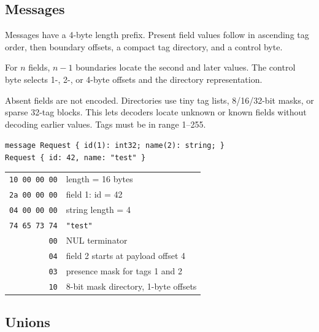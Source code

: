\documentclass[10pt,onecolumn]{article}
\begin{document}
\subsection{Messages}

\begin{minipage}{\textwidth}
\begin{minipage}[t]{0.41\textwidth}
Messages have a 4-byte length prefix. Present field values follow in ascending tag order, then boundary offsets,
a compact tag directory, and a control byte.

\vspace{6pt}
For $n$ fields, $n-1$ boundaries locate the second and later values. The control byte selects 1-, 2-, or 4-byte
offsets and the directory representation.

\vspace{6pt}
Absent fields are not encoded. Directories use tiny tag lists, 8/16/32-bit masks, or sparse 32-tag blocks. This
lets decoders locate unknown or known fields without decoding earlier values. Tags must be in range 1--255.
\end{minipage}\hfill
\begin{minipage}[t]{0.56\textwidth}
\small\raggedright
\texttt{message Request \{ id(1): int32; name(2): string; \}}\\
\texttt{Request \{ id: 42, name: "test" \}}
\vspace{4pt}

\begin{tabular}[t]{@{}r@{\quad}l@{}}
\texttt{10 00 00 00} & length = 16 bytes \\
\texttt{2a 00 00 00} & field 1: id = 42 \\
\texttt{04 00 00 00} & string length = 4 \\
\texttt{74 65 73 74} & \texttt{"test"} \\
\texttt{00} & NUL terminator \\
\texttt{04} & field 2 starts at payload offset 4 \\
\texttt{03} & presence mask for tags 1 and 2 \\
\texttt{10} & 8-bit mask directory, 1-byte offsets \\
\end{tabular}
\end{minipage}
\end{minipage}


\subsection{Unions}
\end{document}
